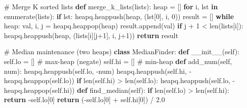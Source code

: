 \documentclass[11pt]{article}
\newenvironment{Shaded}{\begin{snugshade}}{\end{snugshade}}
\newcommand{\BuiltInTok}[1]{\textcolor[rgb]{0.50,0.55,0.55}{#1}}
\newcommand{\CommentTok}[1]{\textcolor[rgb]{0.48,0.49,0.49}{#1}}
\newcommand{\ControlFlowTok}[1]{\textcolor[rgb]{0.99,0.74,0.29}{\textbf{#1}}}
\newcommand{\DecValTok}[1]{\textcolor[rgb]{0.96,0.45,0.00}{#1}}
\newcommand{\FloatTok}[1]{\textcolor[rgb]{0.96,0.45,0.00}{#1}}
\newcommand{\FunctionTok}[1]{\textcolor[rgb]{0.56,0.27,0.68}{#1}}
\newcommand{\KeywordTok}[1]{\textcolor[rgb]{0.81,0.81,0.76}{\textbf{#1}}}
\newcommand{\NormalTok}[1]{\textcolor[rgb]{0.81,0.81,0.76}{#1}}
\newcommand{\OperatorTok}[1]{\textcolor[rgb]{0.81,0.81,0.76}{#1}}
\newcommand{\VariableTok}[1]{\textcolor[rgb]{0.15,0.68,0.68}{#1}}
\begin{document}
\begin{Shaded}
\begin{Highlighting}[]
\CommentTok{\# Merge K sorted lists}
\KeywordTok{def}\NormalTok{ merge\_k\_lists(lists):}
\NormalTok{    heap }\OperatorTok{=}\NormalTok{ []}
    \ControlFlowTok{for}\NormalTok{ i, lst }\KeywordTok{in} \BuiltInTok{enumerate}\NormalTok{(lists):}
        \ControlFlowTok{if}\NormalTok{ lst:}
\NormalTok{            heapq.heappush(heap, (lst[}\DecValTok{0}\NormalTok{], i, }\DecValTok{0}\NormalTok{))}
\NormalTok{    result }\OperatorTok{=}\NormalTok{ []}
    \ControlFlowTok{while}\NormalTok{ heap:}
\NormalTok{        val, i, j }\OperatorTok{=}\NormalTok{ heapq.heappop(heap)}
\NormalTok{        result.append(val)}
        \ControlFlowTok{if}\NormalTok{ j }\OperatorTok{+} \DecValTok{1} \OperatorTok{\textless{}} \BuiltInTok{len}\NormalTok{(lists[i]):}
\NormalTok{            heapq.heappush(heap, (lists[i][j}\OperatorTok{+}\DecValTok{1}\NormalTok{], i, j}\OperatorTok{+}\DecValTok{1}\NormalTok{))}
    \ControlFlowTok{return}\NormalTok{ result}

\CommentTok{\# Median maintenance (two heaps)}
\KeywordTok{class}\NormalTok{ MedianFinder:}
    \KeywordTok{def} \FunctionTok{\_\_init\_\_}\NormalTok{(}\VariableTok{self}\NormalTok{):}
        \VariableTok{self}\NormalTok{.lo }\OperatorTok{=}\NormalTok{ []   }\CommentTok{\# max{-}heap (negate)}
        \VariableTok{self}\NormalTok{.hi }\OperatorTok{=}\NormalTok{ []   }\CommentTok{\# min{-}heap}
    \KeywordTok{def}\NormalTok{ add\_num(}\VariableTok{self}\NormalTok{, num):}
\NormalTok{        heapq.heappush(}\VariableTok{self}\NormalTok{.lo, }\OperatorTok{{-}}\NormalTok{num)}
\NormalTok{        heapq.heappush(}\VariableTok{self}\NormalTok{.hi, }\OperatorTok{{-}}\NormalTok{heapq.heappop(}\VariableTok{self}\NormalTok{.lo))}
        \ControlFlowTok{if} \BuiltInTok{len}\NormalTok{(}\VariableTok{self}\NormalTok{.hi) }\OperatorTok{\textgreater{}} \BuiltInTok{len}\NormalTok{(}\VariableTok{self}\NormalTok{.lo):}
\NormalTok{            heapq.heappush(}\VariableTok{self}\NormalTok{.lo, }\OperatorTok{{-}}\NormalTok{heapq.heappop(}\VariableTok{self}\NormalTok{.hi))}
    \KeywordTok{def}\NormalTok{ find\_median(}\VariableTok{self}\NormalTok{):}
        \ControlFlowTok{if} \BuiltInTok{len}\NormalTok{(}\VariableTok{self}\NormalTok{.lo) }\OperatorTok{\textgreater{}} \BuiltInTok{len}\NormalTok{(}\VariableTok{self}\NormalTok{.hi): }\ControlFlowTok{return} \OperatorTok{{-}}\VariableTok{self}\NormalTok{.lo[}\DecValTok{0}\NormalTok{]}
        \ControlFlowTok{return}\NormalTok{ (}\OperatorTok{{-}}\VariableTok{self}\NormalTok{.lo[}\DecValTok{0}\NormalTok{] }\OperatorTok{+} \VariableTok{self}\NormalTok{.hi[}\DecValTok{0}\NormalTok{]) }\OperatorTok{/} \FloatTok{2.0}
\end{Highlighting}
\end{Shaded}
\end{document}
